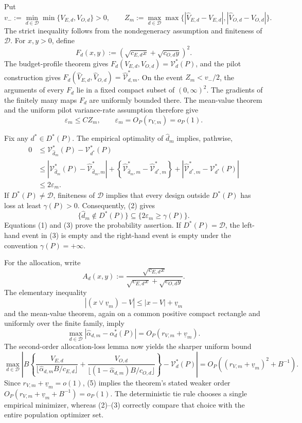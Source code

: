 Put
\[
 v_-:=\min_{d\in\mathcal D}\min\{V_{E,d},V_{O,d}\}>0,
 \qquad
 Z_m:=\max_{d\in\mathcal D}\max\bigl\{
 |\widehat V_{E,d}-V_{E,d}|,
 |\widehat V_{O,d}-V_{O,d}|\bigr\}.
\]
The strict inequality follows from the nondegeneracy assumption and finiteness of \(\mathcal D\).  For \(x,y>0\), define
\[
 F_d(x,y):=\left(\sqrt{c_{E,d}x}+\sqrt{c_{O,d}y}\right)^2.
\]
The budget-profile theorem gives
\(F_d(V_{E,d},V_{O,d})=\mathcal V_d^*(P)\), and the pilot construction gives
\(F_d(\widehat V_{E,d},\widehat V_{O,d})=
\widehat{\mathcal V}_{d,m}^*\).  On the event \(Z_m<v_-/2\), the arguments of every \(F_d\) lie in a fixed compact subset of \((0,\infty)^2\).  The gradients of the finitely many maps \(F_d\) are uniformly bounded there.  The mean-value theorem and the uniform pilot variance-rate assumption therefore give
\[
 \varepsilon_m\le C Z_m,
 \qquad
 \varepsilon_m=O_P(r_{V,m})=o_P(1).                                      \tag{1}
\]

Fix any \(d^*\in D^*(P)\).  The empirical optimality of \(\widehat d_m\) implies, pathwise,
\[
\begin{aligned}
0
&\le \mathcal V_{\widehat d_m}^*(P)-\mathcal V_{d^*}^*(P)\\
&\le
 \left|\mathcal V_{\widehat d_m}^*(P)
       -\widehat{\mathcal V}_{\widehat d_m,m}^*\right|
 +\left\{\widehat{\mathcal V}_{\widehat d_m,m}^*
       -\widehat{\mathcal V}_{d^*,m}^*\right\}
 +\left|\widehat{\mathcal V}_{d^*,m}^*
       -\mathcal V_{d^*}^*(P)\right|\\
&\le 2\varepsilon_m.
\end{aligned}                                                              \tag{2}
\]
If \(D^*(P)\ne\mathcal D\), finiteness of \(\mathcal D\) implies that every design outside \(D^*(P)\) has loss at least \(\gamma(P)>0\).  Consequently, (2) gives
\[
 \{\widehat d_m\notin D^*(P)\}
 \subseteq \{2\varepsilon_m\ge\gamma(P)\}.                                \tag{3}
\]
Equations (1) and (3) prove the probability assertion.  If \(D^*(P)=\mathcal D\), the left-hand event in (3) is empty and the right-hand event is empty under the convention \(\gamma(P)=+\infty\).

For the allocation, write
\[
 A_d(x,y):=
 \frac{\sqrt{c_{E,d}x}}
 {\sqrt{c_{E,d}x}+\sqrt{c_{O,d}y}}.
\]
The elementary inequality
\[
 |(x\vee\underline v_m)-V|
 \le |x-V|+\underline v_m
\]
and the mean-value theorem, again on a common positive compact rectangle and uniformly over the finite family, imply
\[
 \max_{d\in\mathcal D}
 |\widehat\alpha_{d,m}-\alpha_d^*(P)|
 =O_P(r_{V,m}+\underline v_m).                                              \tag{4}
\]
The second-order allocation-loss lemma now yields the sharper uniform bound
\[
 \max_{d\in\mathcal D}\left|
 B\left\{
 \frac{V_{E,d}}{\lfloor\widehat\alpha_{d,m}B/c_{E,d}\rfloor}
 +\frac{V_{O,d}}{\lfloor(1-\widehat\alpha_{d,m})B/c_{O,d}\rfloor}
 \right\}-\mathcal V_d^*(P)\right|
 =O_P\!\left((r_{V,m}+\underline v_m)^2+B^{-1}\right).                    \tag{5}
\]
Since \(r_{V,m}+\underline v_m=o(1)\), (5) implies the theorem's stated weaker order
\(O_P(r_{V,m}+\underline v_m+B^{-1})=o_P(1)\).  The deterministic tie rule chooses a single empirical minimizer, whereas (2)--(3) correctly compare that choice with the entire population optimizer set.